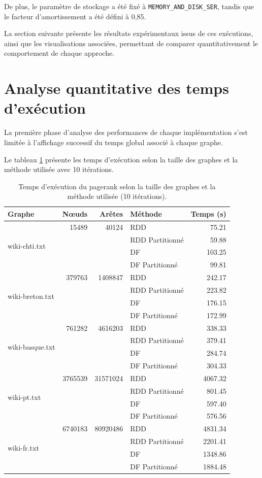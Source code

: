 \documentclass[conference]{IEEEtran}
\renewcommand{\arraystretch}{1.2}
\begin{document}
De plus, le paramètre de stockage a été fixé à \texttt{MEMORY\_AND\_DISK\_SER}, tandis que le facteur d'amortissement a été défini à 
0,85.

La section suivante présente les résultats expérimentaux issus de ces exécutions, ainsi que les visualisations associées, permettant de comparer quantitativement le comportement de chaque approche.

\section{Analyse quantitative des temps d'exécution}

La première phase d'analyse des performances de chaque implémentation s'est limitée à l'affichage successif du temps global associé à chaque graphe.

Le tableau \ref{tab:benchmark_times} présente les temps d'exécution selon la taille des graphes et la méthode utilisée avec 10 itérations.

\begin{table}[ht]
\centering
\caption{Temps d'exécution du \gls{pagerank} selon la taille des graphes et la méthode utilisée (10 itérations).}
\label{tab:benchmark_times}
\renewcommand{\arraystretch}{1.2}
\setlength{\tabcolsep}{4pt}
\begin{tabular}{|l|r|r|l|r|}
\hline
\textbf{Graphe} & \textbf{Nœuds} & \textbf{Arêtes} & \textbf{Méthode} & \textbf{Temps (s)} \\
\hline
\multirow{4}{*}{wiki-chti.txt}
 & 15489 & 40124 & RDD & 75.21 \\
 &  &  & RDD Partitionné & 59.88 \\
 &  &  & DF & 103.25 \\
 &  &  & DF Partitionné & 99.81 \\
\hline
\multirow{4}{*}{wiki-breton.txt}
 & 379763 & 1408847 & RDD & 242.17 \\
 &  &  & RDD Partitionné & 223.82 \\
 &  &  & DF & 176.15 \\
 &  &  & DF Partitionné & 172.99 \\
\hline
\multirow{4}{*}{wiki-basque.txt}
 & 761282 & 4616203 & RDD & 338.33 \\
 &  &  & RDD Partitionné & 379.41 \\
 &  &  & DF & 284.74 \\
 &  &  & DF Partitionné & 304.33 \\
\hline
\multirow{4}{*}{wiki-pt.txt}
 & 3765539 & 31571024 & RDD & 4067.32 \\
 &  &  & RDD Partitionné & 801.45 \\
 &  &  & DF & 597.40 \\
 &  &  & DF Partitionné & 576.56 \\
\hline
\multirow{4}{*}{wiki-fr.txt}
 & 6740183 & 80920486 & RDD & 4831.34 \\
 &  &  & RDD Partitionné & 2201.41 \\
 &  &  & DF & 1348.86 \\
 &  &  & DF Partitionné & 1884.48 \\
\hline
\end{tabular}
\end{table}
\end{document}
